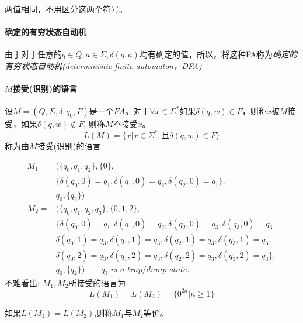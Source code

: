 两值相同，不用区分这两个符号。 

\paragraph{\textbf{确定的有穷状态自动机}}
由于对于任意的$q\in Q, a\in\Sigma, \delta(q,a)$均有确定的值，所以，将这种FA称为\emph{确定的有穷状态自动机(deterministic finite automaton，DFA) }

\paragraph{\textbf{$M$接受(识别)的语言}}

\begin{definition}
	设$M=(Q,\Sigma,\delta,q_0,F)$是一个$FA$。对于$\forall x\in\Sigma^{\ast}$如果$\delta(q,w)\in F$，则称$x$被$M$接受，如果$\delta(q,w)\notin F$, 则称$M$不接受$x$。
	\[L(M)=\{x|x\in\Sigma^{\ast},\text{且}\delta(q,w)\in F\}\]
	称为由$M$接受(识别)的语言
\end{definition}

\begin{example}
	\begin{align*} 
		M_1=&(\{q_0,q_1,q_2\},\{0\},\\
		&\{\delta(q_0,0)=q_1,\delta(q_1,0)=q_2,\delta(q_2,0)=q_1\},\\
		&q_0,\{q_2\})\\
		M_2=&(\{q_0,q_1,q_2,q_3\},\{0,1,2\},\\
		&\{\delta(q_0,0)=q_1,\delta(q_1,0)=q_2,\delta(q_2,0)=q_3,\delta(q_3,0)=q_3\\
		&\delta(q_0,1)=q_3,\delta(q_1,1)=q_3,\delta(q_2,1)=q_3,\delta(q_3,1)=q_3,\\
		&\delta(q_0,2)=q_3,\delta(q_1,2)=q_3,\delta(q_2,2)=q_3,\delta(q_3,2)=q_3\},\\
		&q_0,\{q_2\})\qquad \textit{$q_3$ is a trap/dump state.}  
	\end{align*}
	不难看出: $M_1,M_2$所接受的语言为:
	\[L(M_1)=L(M_2)=\{0^{2n}|n\ge 1\}\]
\end{example}

\begin{definition}\label{M_equivalence}
	如果$L(M_1)=L(M_2)$,则称$M_1$与$M_2$等价。
\end{definition}


